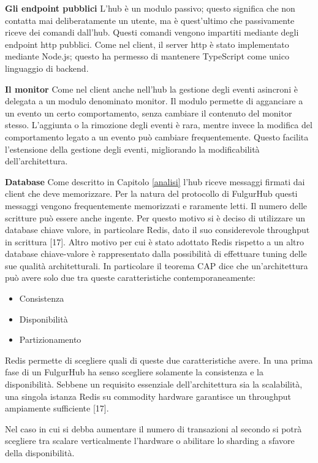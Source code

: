 \documentclass[12pt,italian,]{book}
\providecommand{\tightlist}{%
  \setlength{\itemsep}{0pt}\setlength{\parskip}{0pt}}
\begin{document}
\textbf{\textbf{Gli endpoint pubblici}} L'hub è un modulo passivo; questo significa che non contatta mai deliberatamente un utente, ma è quest'ultimo che passivamente riceve dei comandi dall'hub. Questi comandi vengono impartiti mediante degli endpoint http pubblici. Come nel client, il server http è stato implementato mediante Node.js; questo ha permesso di mantenere TypeScript come unico linguaggio di backend.

\textbf{\textbf{Il monitor}} Come nel client anche nell'hub la gestione degli eventi asincroni è delegata a un modulo denominato monitor. Il modulo permette di agganciare a un evento un certo comportamento, senza cambiare il contenuto del monitor stesso. L'aggiunta o la rimozione degli eventi è rara, mentre invece la modifica del comportamento legato a un evento può cambiare frequentemente. Questo facilita l'estensione della gestione degli eventi, migliorando la modificabilità dell'architettura.

\textbf{\textbf{Database}} Come descritto in Capitolo \ref{analisi} l'hub riceve messaggi firmati dai client che deve memorizzare. Per la natura del protocollo di FulgurHub questi messaggi vengono frequentemente memorizzati e raramente letti. Il numero delle scritture può essere anche ingente. Per questo motivo si è deciso di utilizzare un database chiave valore, in particolare Redis, dato il suo considerevole throughput in scrittura {[}17{]}. Altro motivo per cui è stato adottato Redis rispetto a un altro database chiave-valore è rappresentato dalla possibilità di effettuare tuning delle sue qualità architetturali. In particolare il teorema CAP dice che un'architettura può avere solo due tra queste caratteristiche contemporaneamente:

\begin{itemize}
\tightlist
\item
  Consistenza
\item
  Disponibilità
\item
  Partizionamento
\end{itemize}

Redis permette di scegliere quali di queste due caratteristiche avere. In una prima fase di un FulgurHub ha senso scegliere solamente la consistenza e la disponibilità. Sebbene un requisito essenziale dell'architettura sia la scalabilità, una singola istanza Redis su commodity hardware garantisce un throughput ampiamente sufficiente {[}17{]}.

Nel caso in cui si debba aumentare il numero di transazioni al secondo si potrà scegliere tra scalare verticalmente l'hardware o abilitare lo sharding a sfavore della disponibilità.
\end{document}
